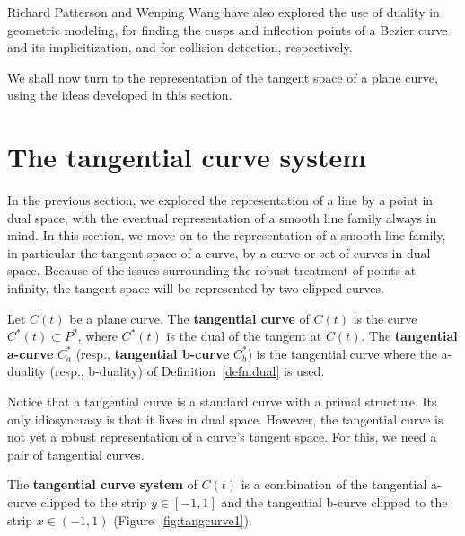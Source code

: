 \documentclass[12pt]{article}
\begin{document}
Richard Patterson \cite{patterson01} and Wenping Wang \cite{wenping01}
have also explored the use of duality in geometric modeling,
for finding the cusps and inflection points of a Bezier curve and its implicitization,
and for collision detection, respectively.

We shall now turn to the representation of the tangent space of a plane curve,
using the ideas developed in this section.


\section{The tangential curve system}
\label{sec:tangcurve}

In the previous section, we explored the representation of a line
by a point in dual space, with the eventual representation of a smooth line family
always in mind.
In this section, we move on to the representation of a smooth line family,
in particular the tangent space of a curve, by a curve or set of curves in dual space.
Because of the issues surrounding the robust treatment of points at infinity,
the tangent space will be represented by two clipped curves.

\begin{defn2}
\label{defn:tangentialcurve}
Let $C(t)$ be a plane curve.
The {\bf tangential curve} of $C(t)$ is the curve $C^*(t) \subset P^2$,
where $C^*(t)$ is the dual of the tangent at $C(t)$.
The {\bf tangential a-curve} $C^*_a$ (resp., {\bf tangential b-curve} $C^*_b$)
is the tangential curve where the a-duality (resp., b-duality) of 
Definition~\ref{defn:dual} is used.
\end{defn2}

Notice that a tangential curve is a standard curve with a primal
structure.
Its only idiosyncrasy is that it lives in dual space.
However, the tangential curve is not yet a robust representation
of a curve's tangent space.
For this, we need a pair of tangential curves.

\begin{defn2}
\label{defn:tangentialsystem}
The {\bf tangential curve system} of $C(t)$ is a combination of
the tangential a-curve clipped to the strip $y \in [-1,1]$ and 
the tangential b-curve clipped to the strip $x \in (-1,1)$
(Figure~\ref{fig:tangcurve1}).
\end{defn2}
\end{document}
